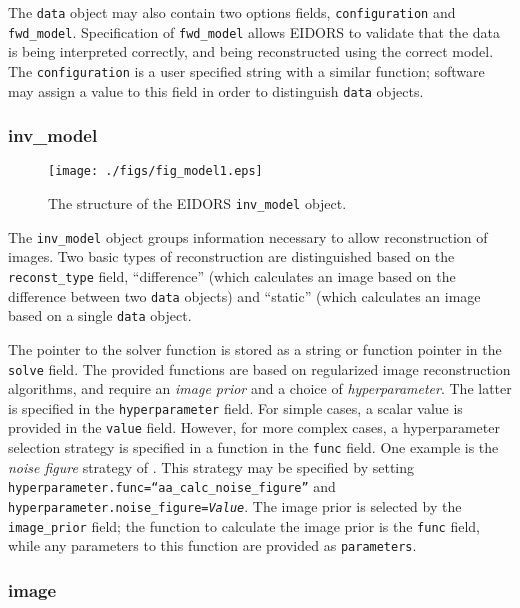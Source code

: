 \documentclass[12pt]{iopart}
\begin{document}
The {\tt data} object may also contain two options fields,
{\tt configuration} and {\tt fwd\_model}. Specification
of {\tt fwd\_model} allows EIDORS to validate that the
data is being interpreted correctly, and being reconstructed
using the correct model. The {\tt configuration} is
a user specified string with a similar function; software
may assign a value to this field in order to distinguish
{\tt data} objects.


\subsubsection{inv\_model}

%
%
\begin{figure}[th]
\begin{flushright}
\texttt{[image: ./figs/fig\_model1.eps]}
\caption{\small The structure of the EIDORS {\tt inv\_model} object.
\label{fig:inv_model}
 }
\end{flushright}
\end{figure}

The {\tt inv\_model} object groups information necessary to 
allow reconstruction of images. Two basic types of reconstruction
are distinguished based on the {\tt reconst\_type} field, 
``difference'' (which calculates an image based on the difference
between two {\tt data} objects) and ``static'' (which calculates an
image based on a single {\tt data} object.

The pointer to the solver function is stored as a string or function
pointer in the {\tt solve} field. The provided functions are based
on regularized image reconstruction algorithms, and require 
an {\em image prior} and a choice of {\em hyperparameter}. 
The latter is specified in the {\tt hyperparameter} field. For
simple cases, a scalar value is provided in the {\tt value} field.
However, for more complex cases, a hyperparameter selection strategy
is specified in a function in the {\tt func} field. One example
is the {\em noise figure} strategy of \cite{Adler_and_Guardo_1996}.
This strategy may be specified by setting
 {\tt hyperparameter.func=``aa\_calc\_noise\_figure''}
and 
 {\tt hyperparameter.noise\_figure=\em Value}.
The image prior is selected by the {\tt image\_prior} field;
the function to calculate the image prior is the {\tt func}
field, while
any parameters to this function are provided as {\tt parameters}.

\subsubsection{image}
\end{document}
